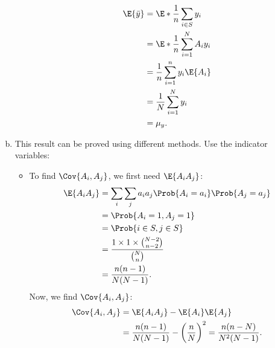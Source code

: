 \begin{Result}{}
\begin{enumerate}[(a)]
\begin{itemize}
\begin{align*}
                                    \E{\bar{y}}  & =\E*{\frac{1}{n}\sum_{i\in S}y_i}                                           \\
                                                 & =\E*{\frac{1}{n}\sum_{i=1}^{N}A_i y_i}                                      \\
                                                 & =\frac{1}{n}\sum_{i=1}^{n}y_i\E{A_i}                                        \\
                                                 & =\frac{1}{N}\sum_{i=1}^{N}y_i                                               \\
                                                 & =\mu_y.
                              \end{align*}
                  \end{itemize}
            \item This result can be proved using different methods. Use the indicator variables:
                  \begin{itemize}
                        \item To find $ \Cov{A_i,A_j} $, we first need $ \E{A_i A_j} $:
                              \begin{align*}
                                    \E{A_i A_j} & =\sum_i\sum_j a_i a_j \Prob{A_i=a_i}\Prob{A_j=a_j}     \\
                                                & =\Prob{A_i=1,A_j=1}                                    \\
                                                & =\Prob{i\in S,j\in S}                                  \\
                                                & =\frac{1\times 1\times \binom{N-2}{n-2}}{\binom{N}{n}} \\
                                                & =\frac{n(n-1)}{N(N-1)}.
                              \end{align*}
                              Now, we find $ \Cov{A_i,A_j} $:
                              \begin{align*}
                                    \Cov{A_i,A_j} & =\E{A_i A_j}-\E{A_i}\E{A_j}                                                 \\
                                                  & =\frac{n(n-1)}{N(N-1)}-\biggl(\frac{n}{N}\biggr)^2=\frac{n(n-N)}{N^2(N-1)}.
                              \end{align*}
                  \end{itemize}

\end{enumerate}
\end{Result}
